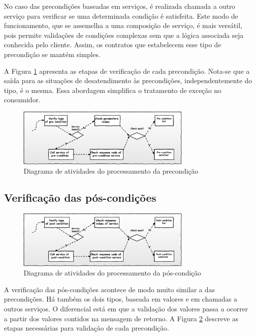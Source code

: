 No caso das precondições baseadas em serviços, é realizada chamada a outro
serviço para verificar se uma determinada condição é satisfeita. Este modo de
funcionamento, que se assemelha a uma composição de serviço, é mais versátil, pois permite
validações de condições complexas sem que a lógica associada seja conhecida pelo
cliente. Assim, os contratos que estabelecem esse tipo de
precondição se mantém simples.

A Figura \ref{FigServicePrecondition} apresenta as etapas de verificação de cada
precondição. Nota-se que a saída para as situações de desatendimento às
precondições, independentemente do tipo, é o mesma. Essa abordagem
simplifica o tratamento de exceção no consumidor.

\begin{figure}[!htb]
\centering
\includegraphics[width=85mm,trim = 0mm 0mm 0mm
0mm,clip]{img/FluxoPrecondicoes.pdf}
\caption{Diagrama de atividades do processamento da precondição}
\label{FigServicePrecondition}
\end{figure}


\subsection{Verificação das pós-condições}


\begin{figure}[!htb]
\centering
\includegraphics[width=85mm,trim = 0mm 0mm 0mm
0mm,clip]{img/FluxoPostcondicoes.pdf}

\caption{Diagrama de atividades do processamento da pós-condição}
\label{FigServicePostcondition}
\end{figure}

A verificação das pós-condições acontece de modo muito similar a das
precondições. Há também os dois tipos, baseada em valores e em chamadas a
outros serviços. O diferencial está em que a validação dos valores passa a
ocorrer a partir dos valores contidos na mensagem de retorno. A Figura
\ref{FigServicePostcondition} descreve as etapas necessárias para validação de
cada precondição.


